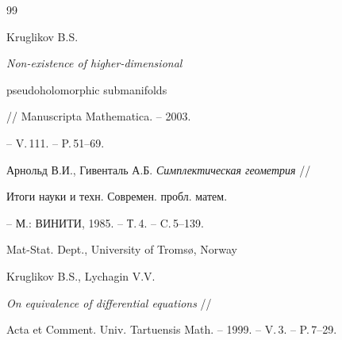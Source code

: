 \begin{thebibliography}{99}


Kruglikov B.S. {\it Non-existence of higher-dimensional


pseudoholomorphic submanifolds} // Manuscripta Mathematica. -- 2003.


-- V.\,111. -- P.\,51--69.







Арнольд В.И., Гивенталь А.Б. {\em Симплектическая геометрия} //


Итоги науки и техн. Современ. пробл. матем.


-- М.: ВИНИТИ, 1985. -- Т.\,4. -- C.\,5--139.








\end{thebibliography}





\vskip 2cm












\label{end}











Mat-Stat. Dept., University of Troms\o, Norway










Kruglikov B.S., Lychagin V.V.


{\it On equivalence of differential equations} //


Acta et Comment. Univ. Tartuensis Math. -- 1999. -- V.\,3. -- P.\,7--29.





